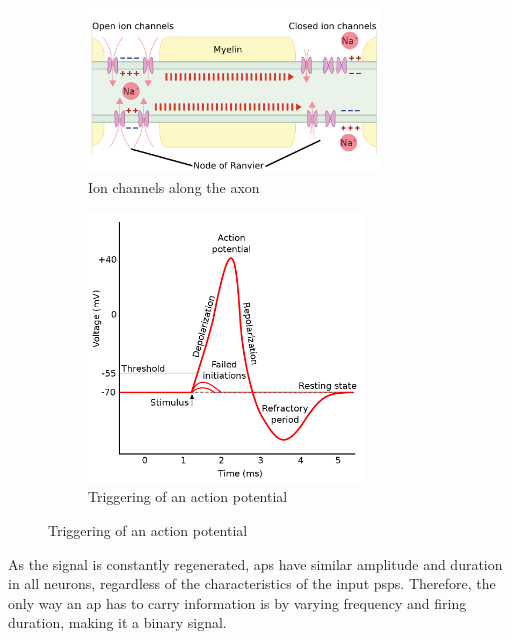 \begin{description}
\begin{description}
                \begin{figure}[H]
                    \begin{subfigure}{.45\textwidth}
                        \centering
                        \includegraphics[width=0.85\textwidth]{./img/saltatory_conduction.png}
                        \caption{Ion channels along the axon}
                    \end{subfigure}
                    \begin{subfigure}{.45\textwidth}
                        \centering
                        \includegraphics[width=0.8\textwidth]{./img/action_potential.png}
                        \caption{Triggering of an action potential}
                    \end{subfigure}
                \end{figure}
        \end{description}


        \begin{remark}
            As the signal is constantly regenerated, 
            \Acp{ap} have similar amplitude and duration in all neurons, regardless of the characteristics of the input \acp{psp}.
            Therefore, the only way an \ac{ap} has to carry information is by varying frequency and firing duration, making it a binary signal.
        \end{remark}
\end{description}

